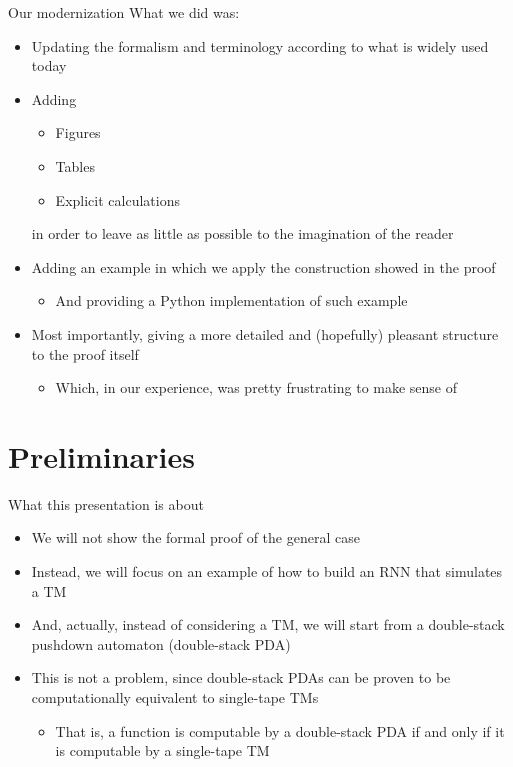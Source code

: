 \documentclass{beamer}
\begin{document}
\begin{frame}{Our modernization}
	What we did was:
	\begin{itemize}
		\pause
		\item Updating the formalism and terminology according to what is widely used today
		\pause
		\item Adding 
		\begin{itemize}
			\pause
			\item Figures
			\pause 
			\item Tables
			\pause
			\item Explicit calculations
			\pause
		\end{itemize}
		in order to leave as little as possible to the imagination of the reader
		\pause
		\item Adding an example in which we apply the construction showed in the proof
		\begin{itemize}
			\pause
			\item And providing a Python implementation of such example
			\pause
		\end{itemize}
		\item Most importantly, giving a more detailed and (hopefully) pleasant structure to the proof itself
		\begin{itemize}
			\pause
			\item Which, in our experience, was pretty frustrating to make sense of
		\end{itemize}
	\end{itemize}
\end{frame}

\section{Preliminaries}

\begin{frame}{What this presentation is about}
	\begin{itemize}
		\item We will not show the formal proof of the general case
		\pause		
		\item Instead, we will focus on an example of how to build an RNN that simulates a TM
		\pause
		\item And, actually, instead of considering a TM, we will start from a \textcolor{unifiRed}{double-stack pushdown automaton} (double-stack PDA)
		\pause
		\item This is not a problem, since double-stack PDAs can be proven to be computationally equivalent to single-tape TMs
		\begin{itemize}
			\pause
			\item That is, a function is computable by a double-stack PDA if and only if it is computable by a single-tape TM
		\end{itemize}
	\end{itemize}
\end{frame}
\end{document}
